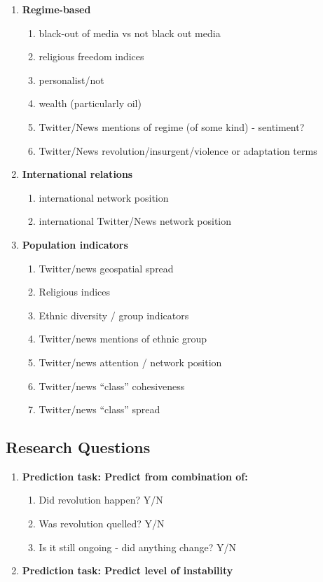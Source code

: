 \begin{enumerate}
    \item {\bf Regime-based}
        \begin{enumerate}
            \item black-out of media vs not black out media 
            \item religious freedom indices
            \item personalist/not \cite{goldstone_bringing_2013}
            \item wealth (particularly oil) \cite{goldstone_bringing_2013}
            \item Twitter/News mentions of regime (of some kind) - sentiment?
            \item Twitter/News revolution/insurgent/violence or adaptation terms
        \end{enumerate}
    \item {\bf International relations} 
        \begin{enumerate}
            \item international network position
            \item international Twitter/News network position
        \end{enumerate}
    \item {\bf Population indicators } 
        \begin{enumerate}
            \item Twitter/news geospatial spread
            \item Religious indices
            \item Ethnic diversity / group indicators
            \item Twitter/news mentions of ethnic group
            \item Twitter/news attention / network position
            \item Twitter/news ``class'' cohesiveness \cite{goldstone_cross-class_2011}
            \item Twitter/news ``class'' spread \cite{goldstone_cross-class_2011}
        \end{enumerate}
\end{enumerate}

\subsection{Research Questions}

\begin{enumerate}
    \item {\bf Prediction task: Predict from combination of: }
        \begin{enumerate}
            \item Did revolution happen? Y/N
            \item Was revolution quelled? Y/N
            \item Is it still ongoing - did anything change? Y/N
        \end{enumerate}

    \item {\bf Prediction task: Predict level of instability}
\end{enumerate}

